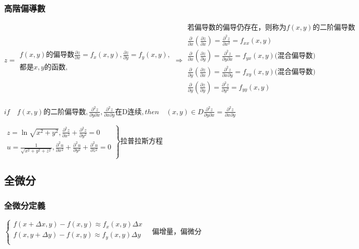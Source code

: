 \documentclass[UTF8]{ctexart}
\newcommand{\mt}[1]{\text{#1}}
\newcommand{\mf}[1]{\left( #1\right)}
\newcommand{\q}{\quad}
\newcommand{\qa}{\vspace{12 pt}}
\newcommand{\p}{\par}
\newcommand{\ma}[1]{\begin{array}{llll} #1 \end{array}}
\begin{document}
\subsubsection{高階偏導數}

$z=\ma{f\mf{x,y}\mt{的偏导数}\frac{\partial z}{\partial x}=f_x\mf{x,y},\frac{\partial z}{\partial y}=f_y\mf{x,y},\\
\mt{都是}x,y\mt{的函数,}} \Rightarrow
\ma{\mt{若偏导数的偏导仍存在，则称为}f\mf{x,y}\mt{的二阶偏导数}\\
\frac{\partial}{\partial x}\mf{\frac{\partial z}{\partial x}}=\frac{\partial^2z}{\partial x^2}=f_{xx}\mf{x,y}  \\
\frac{\partial}{\partial x}\mf{\frac{\partial z}{\partial y}}=\frac{\partial^2z}{\partial y \partial x}=f_{yx}\mf{x,y} \mt{(混合偏导数)} \\
\frac{\partial}{\partial y}\mf{\frac{\partial z}{\partial x}}=\frac{\partial^2z}{\partial x \partial y}=f_{xy}\mf{x,y} \mt{(混合偏导数)} \\
\frac{\partial}{\partial y}\mf{\frac{\partial z}{\partial y}}=\frac{\partial^2z}{\partial y^2}=f_{yy}\mf{x,y}  \\
}$\p

\qa

$if \q  f\mf{x,y}\mt{的二阶偏导数}, \frac{\partial^2z}{\partial y \partial x} ,\frac{\partial^2z}{\partial x \partial y}\mt{在D连续},then \q  \mf{x,y} \in D \frac{\partial^2z}{\partial y \partial x} =\frac{\partial^2z}{\partial x \partial y}$

$\left.\ma{z=\ln \sqrt{x^2+y^2}, \frac{\partial^2 z}{\partial x^2}+\frac{\partial^2 z}{\partial y^2}=0\\
    u=\frac{1}{\sqrt{x^2+y^2+z^2}},\frac{\partial^2 u}{\partial x^2}+\frac{\partial^2 u}{\partial y^2}+\frac{\partial^2 u}{\partial z^2}=0\\
}\right\}\mt{拉普拉斯方程}$


\subsection{全微分}
\subsubsection{全微分定義}
$\left\{\ma{f\mf{x+\Delta x,y}-f\mf{x,y} \approx f_x\mf{x,y}\Delta x\\
    f\mf{x,y+\Delta y}-f\mf{x,y} \approx f_y\mf{x,y}\Delta y\\
}\right. \q  \mt{偏增量，偏微分}$\p
\end{document}
